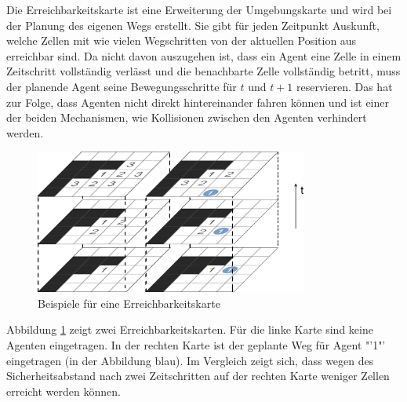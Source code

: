 Die Erreichbarkeitskarte ist eine Erweiterung der Umgebungskarte und wird bei der Planung des eigenen Wegs erstellt. Sie gibt für jeden Zeitpunkt Auskunft, welche Zellen mit wie vielen Wegschritten von der aktuellen Position aus erreichbar sind. Da nicht davon auszugehen ist, dass ein Agent eine Zelle in einem Zeitschritt vollständig verlässt und die benachbarte Zelle vollständig betritt, muss der planende Agent seine Bewegungsschritte für \(t\) und \(t + 1\) reservieren. Das hat zur Folge, dass Agenten nicht direkt hintereinander fahren können und ist einer der beiden Mechanismen, wie Kollisionen zwischen den Agenten verhindert werden. \cite{book:regele}
\begin{figure}[H]
    \includegraphics[width=9cm]{images/extended_occupancy.png}
    \centering
    \caption{Beispiele für eine Erreichbarkeitskarte}
    \label{fig:extended_occupancy}
\end{figure}
Abbildung \ref{fig:extended_occupancy} zeigt zwei Erreichbarkeitskarten. Für die linke Karte sind keine Agenten eingetragen. In der rechten Karte ist der geplante Weg für Agent "'1"' eingetragen (in der Abbildung blau). Im Vergleich zeigt sich, dass wegen des Sicherheitsabstand nach zwei Zeitschritten auf der rechten Karte weniger Zellen erreicht werden können.